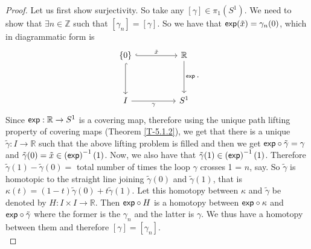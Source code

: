 \documentclass[letterpaper,11pt,twoside]{article}
\theoremstyle{definition}
\theoremstyle{definition}
\theoremstyle{definition}
\theoremstyle{definition}
\theoremstyle{definition}
\theoremstyle{definition}
\theoremstyle{remark}
\theoremstyle{definition}
\newcommand{\R}[0]{\mathbb{R}}
\newcommand{\inv}[1]{\left(#1\right)^{-1}}
\renewcommand{\exp}[0]{{\fontfamily{lmss}\selectfont 
        \text{exp}
}}
\newcommand{\Z}[0]{\mathbb{Z}}
\begin{document}
\begin{proof}
Let us first show surjectivity. So take any $[\gamma]\in \pi_1(S^1)$. We need to show that $\exists n\in \Z$ such that $[\gamma_n] = [\gamma]$. So we have that $\exp(\tilde{x}) = \gamma_n(0)$, which in diagrammatic form is
\[\begin{tikzcd}
	{\{0\}} && \R \\
	\\
	I && {S^1}
	\arrow[hook, from=1-1, to=3-1]
	\arrow["{\tilde{x}}", hook, from=1-1, to=1-3]
	\arrow["\exp", from=1-3, to=3-3]
	\arrow["\gamma"', from=3-1, to=3-3]
\end{tikzcd}.\]
Since $\exp: \R\to S^1$ is a covering map, therefore using the unique path lifting property of covering maps (Theorem \ref{T-5.1.2}), we get that there is a unique $\tilde{\gamma} : I\to \R$ such that the above lifting problem is filled and then we get $\exp\circ \tilde{\gamma} = \gamma$ and $\tilde{\gamma}(0) = \tilde{x} \in \inv{\exp}(1)$. Now, we also have that $\tilde{\gamma}(1) \in \inv{\exp}(1)$. Therefore $\tilde{\gamma}(1) - \tilde{\gamma}(0) = $ total number of times the loop $\gamma$ crosses 1 = $n$, say. So $\tilde{\gamma}$ is homotopic to the straight line joining $\tilde{\gamma}(0)$ and $\tilde{\gamma}(1)$, that is $\kappa(t) = (1-t)\tilde{\gamma}(0) + t\tilde{\gamma}(1)$. Let this homotopy between $\kappa $ and $\tilde{\gamma}$ be denoted by $H : I\times I \to \R$. Then $\exp \circ H$ is a homotopy between $\exp \circ \kappa$ and $\exp \circ \tilde{\gamma}$ where the former is the $\gamma_n$ and the latter is $\gamma$. We thus have a homotopy between them and therefore $[\gamma]= [\gamma_n]$.\\


\end{proof}
\end{document}
